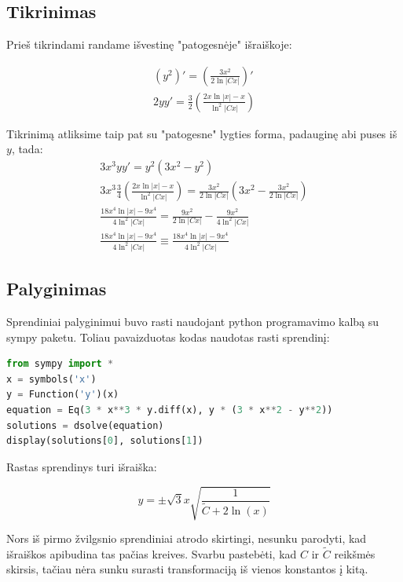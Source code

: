\documentclass[11pt]{article}
\begin{document}
\newpage
\subsection{Tikrinimas}

Prieš tikrindami randame išvestinę "patogesnėje" išraiškoje:

\begin{equation}
\begin{split}
(y^2)'=\left(\frac{3x^2}{2\ln|Cx|}\right)'\\
2yy'=\frac{3}{2}\left(\frac{2x\ln|x|-x}{\ln^2|Cx|}\right)
\end{split}
\end{equation}

Tikrinimą atliksime taip pat su "patogesne" lygties forma, padauginę abi puses iš $y$, tada:
\begin{equation}
\begin{split}
3x^3yy'=y^2(3x^2-y^2)\\
3x^3\frac{3}{4}\left(\frac{2x\ln|x|-x}{\ln^2|Cx|}\right)=\frac{3x^2}{2\ln|Cx|}\left(3x^2-\frac{3x^2}{2\ln|Cx|}\right)\\
\frac{18x^4\ln|x|-9x^4}{4\ln^2|Cx|}=\frac{9x^2}{2\ln|Cx|}-\frac{9x^2}{4\ln^2|Cx|}\\
\frac{18x^4\ln|x|-9x^4}{4\ln^2|Cx|}\equiv\frac{18x^4\ln|x|-9x^4}{4\ln^2|Cx|}
\end{split}
\end{equation}

\subsection{Palyginimas}

Sprendiniai palyginimui buvo rasti naudojant 
python programavimo kalbą su sympy paketu. 
Toliau pavaizduotas kodas naudotas rasti sprendinį:

\begin{lstlisting}[language=Python]
from sympy import *
x = symbols('x')
y = Function('y')(x)
equation = Eq(3 * x**3 * y.diff(x), y * (3 * x**2 - y**2))
solutions = dsolve(equation)
display(solutions[0], solutions[1])
\end{lstlisting}

Rastas sprendinys turi išraiška:

\begin{equation}
y=\pm\sqrt 3x\sqrt{\frac{1}{\widetilde{C}+2\ln(x)}}
\end{equation}

Nors iš pirmo žvilgsnio sprendiniai atrodo skirtingi, nesunku parodyti, 
kad išraiškos apibudina tas pačias kreives. Svarbu pastebėti, kad $C$ ir $\widetilde{C}$ reikšmės
skirsis, tačiau nėra sunku surasti transformaciją iš vienos konstantos į kitą.
\end{document}
